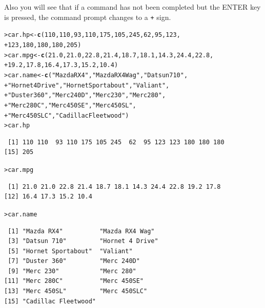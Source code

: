 \documentclass[12pt,oneside]{book}\usepackage[]{graphicx}\usepackage[]{color}
\makeatletter
\newcommand{\hlnum}[1]{\textcolor[rgb]{0.686,0.059,0.569}{#1}}%
\newcommand{\hlstr}[1]{\textcolor[rgb]{0.192,0.494,0.8}{#1}}%
\newcommand{\hlstd}[1]{\textcolor[rgb]{0.345,0.345,0.345}{#1}}%
\newcommand{\hlkwb}[1]{\textcolor[rgb]{0.69,0.353,0.396}{#1}}%
\newcommand{\hlkwd}[1]{\textcolor[rgb]{0.737,0.353,0.396}{\textbf{#1}}}%
\newenvironment{kframe}{%
 \def\at@end@of@kframe{}%
 \ifinner\ifhmode%
  \def\at@end@of@kframe{\end{minipage}}%
  \begin{minipage}{\columnwidth}%
 \fi\fi%
 \def\FrameCommand##1{\hskip\@totalleftmargin \hskip-\fboxsep
 \colorbox{shadecolor}{##1}\hskip-\fboxsep
     \hskip-\linewidth \hskip-\@totalleftmargin \hskip\columnwidth}%
 \MakeFramed {\advance\hsize-\width
   \@totalleftmargin\z@ \linewidth\hsize
   \@setminipage}}%
 {\par\unskip\endMakeFramed%
 \at@end@of@kframe}
\newenvironment{knitrout}{}{} %
\makeatother
\begin{document}
Also you will see that if a command has not been completed but the ENTER key is pressed, the command prompt changes to a \verb-+- sign.
\begin{knitrout}
\color{fgcolor}\begin{kframe}
\begin{alltt}
\hlstd{> }\hlstd{car.hp} \hlkwb{<-} \hlkwd{c}\hlstd{(}\hlnum{110}\hlstd{,} \hlnum{110}\hlstd{,} \hlnum{93}\hlstd{,} \hlnum{110}\hlstd{,} \hlnum{175}\hlstd{,} \hlnum{105}\hlstd{,} \hlnum{245}\hlstd{,} \hlnum{62}\hlstd{,} \hlnum{95}\hlstd{,} \hlnum{123}\hlstd{,}
\hlstd{+ }\hlnum{123}\hlstd{,} \hlnum{180}\hlstd{,} \hlnum{180}\hlstd{,} \hlnum{180}\hlstd{,} \hlnum{205}\hlstd{)}
\hlstd{> }\hlstd{car.mpg} \hlkwb{<-} \hlkwd{c}\hlstd{(}\hlnum{21.0}\hlstd{,} \hlnum{21.0}\hlstd{,} \hlnum{22.8}\hlstd{,} \hlnum{21.4}\hlstd{,} \hlnum{18.7}\hlstd{,} \hlnum{18.1}\hlstd{,} \hlnum{14.3}\hlstd{,} \hlnum{24.4}\hlstd{,} \hlnum{22.8}\hlstd{,}
\hlstd{+ }             \hlnum{19.2}\hlstd{,} \hlnum{17.8}\hlstd{,} \hlnum{16.4}\hlstd{,} \hlnum{17.3}\hlstd{,} \hlnum{15.2}\hlstd{,} \hlnum{10.4}\hlstd{)}
\hlstd{> }\hlstd{car.name} \hlkwb{<-} \hlkwd{c}\hlstd{(}\hlstr{"Mazda RX4"}\hlstd{,} \hlstr{"Mazda RX4 Wag"}\hlstd{,} \hlstr{"Datsun 710"}\hlstd{,}
\hlstd{+ }              \hlstr{"Hornet 4 Drive"}\hlstd{,} \hlstr{"Hornet Sportabout"}\hlstd{,} \hlstr{"Valiant"}\hlstd{,}
\hlstd{+ }              \hlstr{"Duster 360"}\hlstd{,} \hlstr{"Merc 240D"}\hlstd{,} \hlstr{"Merc 230"}\hlstd{,} \hlstr{"Merc 280"}\hlstd{,}
\hlstd{+ }              \hlstr{"Merc 280C"}\hlstd{,} \hlstr{"Merc 450SE"}\hlstd{,} \hlstr{"Merc 450SL"}\hlstd{,}
\hlstd{+ }              \hlstr{"Merc 450SLC"}\hlstd{,} \hlstr{"Cadillac Fleetwood"}\hlstd{)}
\hlstd{> }\hlstd{car.hp}
\end{alltt}
\begin{verbatim}
 [1] 110 110  93 110 175 105 245  62  95 123 123 180 180 180
[15] 205
\end{verbatim}
\begin{alltt}
\hlstd{> }\hlstd{car.mpg}
\end{alltt}
\begin{verbatim}
 [1] 21.0 21.0 22.8 21.4 18.7 18.1 14.3 24.4 22.8 19.2 17.8
[12] 16.4 17.3 15.2 10.4
\end{verbatim}
\begin{alltt}
\hlstd{> }\hlstd{car.name}
\end{alltt}
\begin{verbatim}
 [1] "Mazda RX4"          "Mazda RX4 Wag"     
 [3] "Datsun 710"         "Hornet 4 Drive"    
 [5] "Hornet Sportabout"  "Valiant"           
 [7] "Duster 360"         "Merc 240D"         
 [9] "Merc 230"           "Merc 280"          
[11] "Merc 280C"          "Merc 450SE"        
[13] "Merc 450SL"         "Merc 450SLC"       
[15] "Cadillac Fleetwood"
\end{verbatim}
\end{kframe}
\end{knitrout}
\end{document}
